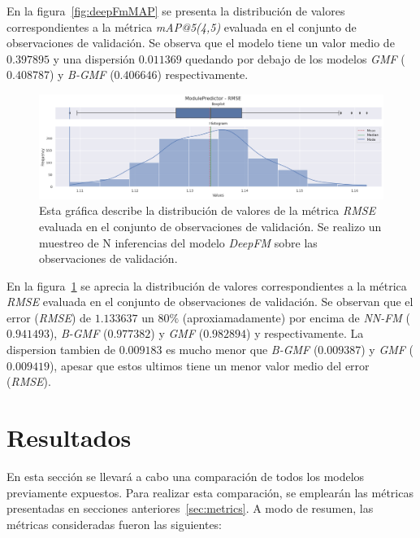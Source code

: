 \documentclass[11pt,a4paper,twoside]{thesis}
\begin{document}
En la figura~\ref{fig:deepFmMAP} se presenta la distribución de valores
correspondientes a la métrica \textit{mAP@5(4,5)} evaluada en el conjunto de
observaciones de validación. Se observa que el modelo tiene un valor medio de
$0.397895$ y una dispersión $0.011369$ quedando por debajo de los modelos
\textit{GMF} ($0.408787$) y \textit{B-GMF} ($0.406646$) respectivamente.

\begin{figure}[h!]
	\centering
	\includegraphics[width=15cm]{./images/metrics-DeepFM-RMSE.png}
	\caption{
		Esta gráfica describe la distribución de valores de la métrica
		\textit{RMSE} evaluada en el conjunto de observaciones de
		validación. Se realizo un muestreo de N inferencias del modelo
		\textit{DeepFM} sobre las observaciones
		de validación.
	}
	\label{fig:deepFmRMSE}
\end{figure}

En la figura~\ref{fig:deepFmRMSE} se aprecia la distribución de valores
correspondientes a la métrica \textit{RMSE} evaluada en el conjunto de
observaciones de validación. Se observan que el error (\textit{RMSE}) de
$1.133637$ un $80\%$ (aproxiamadamente) por encima de \textit{NN-FM}
($0.941493$), \textit{B-GMF} ($0.977382$) y \textit{GMF} ($0.982894$) y
respectivamente. La dispersion tambien de $0.009183$ es mucho menor que
\textit{B-GMF} ($0.009387$) y \textit{GMF} ($0.009419$), apesar que estos
ultimos tiene un menor valor medio del error (\textit{RMSE}).

\chapter{Resultados}

En esta sección se llevará a cabo una comparación de todos los modelos
previamente expuestos. Para realizar esta comparación, se emplearán las
métricas presentadas en secciones anteriores~\autoref{sec:metrics}. A modo de
resumen, las métricas consideradas fueron las siguientes:
\end{document}
